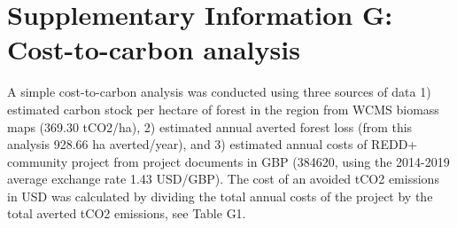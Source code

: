 \documentclass[
]{article}
\begin{document}
\setcounter{table}{0}  
\renewcommand{\thetable}{G\arabic{table}}
\setcounter{figure}{0} 
\renewcommand{\thefigure}{G\arabic{figure}}

\clearpage

\hypertarget{supplementary-information-g-cost-to-carbon-analysis}{%
\section*{Supplementary Information G: Cost-to-carbon
analysis}\label{supplementary-information-g-cost-to-carbon-analysis}}

A simple cost-to-carbon analysis was conducted using three sources of
data 1) estimated carbon stock per hectare of forest in the region from
WCMS biomass maps (369.30 tCO2/ha), 2) estimated annual averted forest
loss (from this analysis 928.66 ha averted/year), and 3) estimated
annual costs of REDD+ community project from project documents in GBP
(384620, using the 2014-2019 average exchange rate 1.43 USD/GBP). The
cost of an avoided tCO2 emissions in USD was calculated by dividing the
total annual costs of the project by the total averted tCO2 emissions,
see Table G1.
\end{document}
